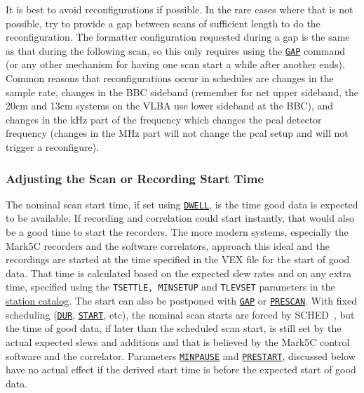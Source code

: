 \documentclass{report}
\newcommand{\schedb}{{\sc SCHED~}}
\begin{document}
It is best to avoid reconfigurations if possible.  In the rare cases
where that is not possible, try to provide a gap between scans of
sufficient length to do the reconfiguration.  The formatter
configuration requested during a gap is the same as that during the
following scan, so this only requires using the 
{\hyperref[MP:GAP]{{\tt GAP}}} command
(or any other mechanism for having one scan
start a while after another ends).  Common reasons that
reconfigurations occur in schedules are changes in the sample rate,
changes in the BBC sideband (remember for net upper sideband, the 20cm
and 13cm systems on the VLBA use lower sideband at the BBC), and
changes in the kHz part of the frequency which changes the pcal
detector frequency (changes in the MHz part will not change the pcal
setup and will not trigger a reconfigure).

\subsubsection{\label{SSSEC:Starttime}Adjusting the Scan or Recording
Start Time}

The nominal scan start time, if set using 
{\hyperref[MP:DWELL]{{\tt DWELL}}},
is the time good data is expected to be available.
If recording and correlation could start instantly, that would also be
a good time to start the recorders.  The more modern systems,
especially the Mark5C recorders and the software correlators, approach
this ideal and the recordings are started at the time specified in the
VEX file for the start of good data.  That time is calculated based on
the expected slew rates and on any extra time, specified using the
{\tt TSETTLE, MINSETUP} and {\tt TLEVSET} parameters in the
{\hyperref[SEC:STACAT]{station catalog}}.  The start can also be
postponed with 
{\hyperref[MP:GAP]{{\tt GAP}}} or 
{\hyperref[MP:PRESCAN]{{\tt PRESCAN}}}.  With fixed scheduling
({\hyperref[MP:DUR]{{\tt DUR}}},
{\hyperref[MP:START]{{\tt START}}}, etc), the nominal scan starts are
forced by \schedb, but the time of good data, if later than the
scheduled scan start, is still set by the actual expected slews and
additions and that is believed by the Mark5C control software and the
correlator.  Parameters 
{\hyperref[MP:MINPAUSE]{{\tt MINPAUSE}}} and
{\hyperref[MP:PRESTART]{{\tt PRESTART}}}, discussed below have no actual
effect if the derived start time is before the expected start of good
data.
\end{document}
